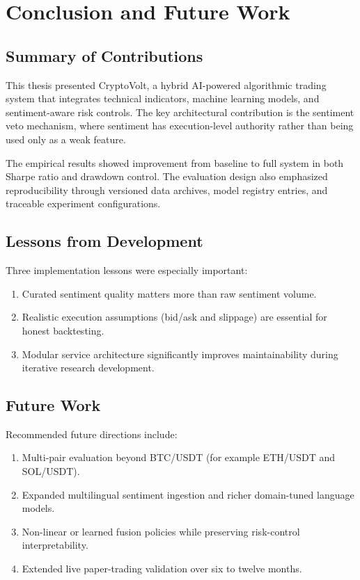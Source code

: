 \chapter{Conclusion and Future Work}\label{ch6}

\section{Summary of Contributions}
This thesis presented CryptoVolt, a hybrid AI-powered algorithmic trading system that integrates technical indicators, machine learning models, and sentiment-aware risk controls. The key architectural contribution is the sentiment veto mechanism, where sentiment has execution-level authority rather than being used only as a weak feature.

The empirical results showed improvement from baseline to full system in both Sharpe ratio and drawdown control. The evaluation design also emphasized reproducibility through versioned data archives, model registry entries, and traceable experiment configurations.

\section{Lessons from Development}
Three implementation lessons were especially important:
\begin{enumerate}
	\item Curated sentiment quality matters more than raw sentiment volume.
	\item Realistic execution assumptions (bid/ask and slippage) are essential for honest backtesting.
	\item Modular service architecture significantly improves maintainability during iterative research development.
\end{enumerate}

\section{Future Work}
Recommended future directions include:
\begin{enumerate}
	\item Multi-pair evaluation beyond BTC/USDT (for example ETH/USDT and SOL/USDT).
	\item Expanded multilingual sentiment ingestion and richer domain-tuned language models.
	\item Non-linear or learned fusion policies while preserving risk-control interpretability.
	\item Extended live paper-trading validation over six to twelve months.
\end{enumerate}

